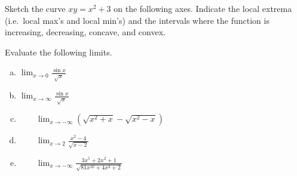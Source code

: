 \documentclass[12pt]{article}
\begin{document}
\newpage
\noindent
{} Sketch the curve $xy = x^2 + 3$ on the following axes.
Indicate the local extrema (i.e.\
local max's and local min's) and the intervals where the function is increasing,
decreasing, concave, and convex. 

\vspace{2em}

\begin{center}
\end{center}


\newpage
\noindent
{} Evaluate the following limits. 

\begin{enumerate}[a)]
\item{}
    \qquad $ \lim_{x \to 0} \displaystyle \frac{\sin x}{\sqrt{x}}$
    \item{}
        \vspace{8em}
    \qquad $ \displaystyle \lim_{x \to \infty} \displaystyle \frac{\sin x}{\sqrt{x}}$
    \item{}
        \vspace{8em}
        $ \qquad \displaystyle \lim_{x \to -\infty}(\sqrt{x^2 + x} - \sqrt{x^2
        - x})$ 
        \item{}
            \vspace{8em}
        $\qquad \displaystyle \lim_{x \to 2} \frac{x^{2} - 4}{ \sqrt{x -2}} $
        \item{}
            \vspace{8em}
            $\qquad \displaystyle \lim_{x \to -\infty} \frac{3x^{5} + 2x^{2} + 1}{\sqrt{81x^{10}  + 4x^{3} + 2}} $
\end{enumerate}
\end{document}
